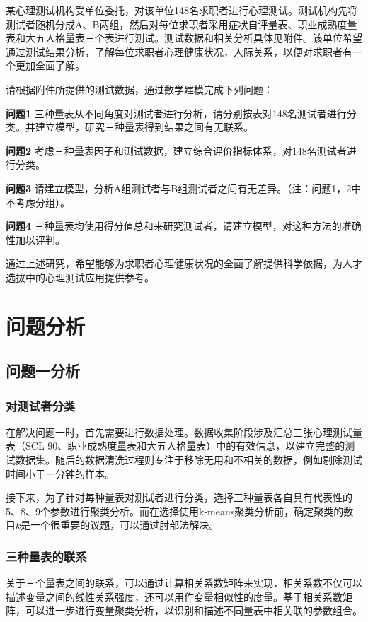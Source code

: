 \documentclass[withoutpreface,bwprint]{cumcmthesis} %
\begin{document}
某心理测试机构受单位委托，对该单位148名求职者进行心理测试。测试机构先将测试者随机分成A、B两组，然后对每位求职者采用症状自评量表、职业成熟度量表和大五人格量表三个表进行测试。测试数据和相关分析具体见附件。该单位希望通过测试结果分析，了解每位求职者心理健康状况，人际关系，以便对求职者有一个更加全面了解。

请根据附件所提供的测试数据，通过数学建模完成下列问题：

\textbf{问题1} 三种量表从不同角度对测试者进行分析，请分别按表对148名测试者进行分类。并建立模型，研究三种量表得到结果之间有无联系。

\textbf{问题2} 考虑三种量表因子和测试数据，建立综合评价指标体系，对148名测试者进行分类。

\textbf{问题3} 请建立模型，分析A组测试者与B组测试者之间有无差异。（注：问题1，2中不考虑分组）。

\textbf{问题4} 三种量表均使用得分值总和来研究测试者，请建立模型，对这种方法的准确性加以评判。


通过上述研究，希望能够为求职者心理健康状况的全面了解提供科学依据，为人才选拔中的心理测试应用提供参考。


\section{问题分析}

\subsection{问题一分析}

\subsubsection*{对测试者分类}

在解决问题一时，首先需要进行数据处理。数据收集阶段涉及汇总三张心理测试量表（SCL-90、职业成熟度量表和大五人格量表）中的有效信息，以建立完整的测试数据集。随后的数据清洗过程则专注于移除无用和不相关的数据，例如剔除测试时间小于一分钟的样本。

接下来，为了针对每种量表对测试者进行分类，选择三种量表各自具有代表性的5、8、9个参数进行聚类分析。而在选择使用k-means聚类分析前，确定聚类的数目$k$是一个很重要的议题，可以通过肘部法解决。


\subsubsection*{三种量表的联系}
关于三个量表之间的联系，可以通过计算相关系数矩阵来实现，相关系数不仅可以描述变量之间的线性关系强度，还可以用作变量相似性的度量。基于相关系数矩阵，可以进一步进行变量聚类分析，以识别和描述不同量表中相关联的参数组合。
\end{document}

